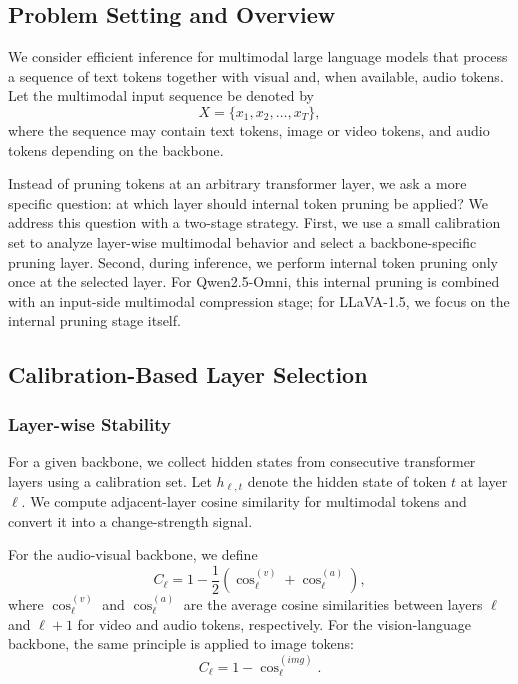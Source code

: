 \documentclass[10pt,a4paper]{article}
\begin{document}
\subsection{Problem Setting and Overview}
We consider efficient inference for multimodal large language models that process a sequence of text tokens together with visual and, when available, audio tokens. Let the multimodal input sequence be denoted by
\begin{equation}
X = \{x_1, x_2, \dots, x_T\},
\end{equation}
where the sequence may contain text tokens, image or video tokens, and audio tokens depending on the backbone.

Instead of pruning tokens at an arbitrary transformer layer, we ask a more specific question: at which layer should internal token pruning be applied? We address this question with a two-stage strategy. First, we use a small calibration set to analyze layer-wise multimodal behavior and select a backbone-specific pruning layer. Second, during inference, we perform internal token pruning only once at the selected layer. For Qwen2.5-Omni, this internal pruning is combined with an input-side multimodal compression stage; for LLaVA-1.5, we focus on the internal pruning stage itself.

\subsection{Calibration-Based Layer Selection}

\subsubsection{Layer-wise Stability}
For a given backbone, we collect hidden states from consecutive transformer layers using a calibration set. Let $h_{\ell,t}$ denote the hidden state of token $t$ at layer $\ell$. We compute adjacent-layer cosine similarity for multimodal tokens and convert it into a change-strength signal.

For the audio-visual backbone, we define
\begin{equation}
C_\ell = 1 - \frac{1}{2}\left(\cos^{(v)}_\ell + \cos^{(a)}_\ell\right),
\end{equation}
where $\cos^{(v)}_\ell$ and $\cos^{(a)}_\ell$ are the average cosine similarities between layers $\ell$ and $\ell+1$ for video and audio tokens, respectively. For the vision-language backbone, the same principle is applied to image tokens:
\begin{equation}
C_\ell = 1 - \cos^{(img)}_\ell.
\end{equation}
\end{document}
